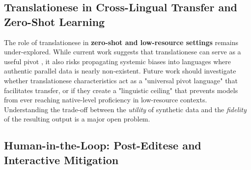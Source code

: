 \documentclass[11pt,a4paper]{article}
\begin{document}
\subsection{Translationese in Cross-Lingual Transfer and Zero-Shot Learning}

The role of translationese in \textbf{zero-shot and low-resource settings} remains under-explored. While current work suggests that translationese can serve as a useful pivot \cite{dabre2024pretraining, riley2020translationese}, it also risks propagating systemic biases into languages where authentic parallel data is nearly non-existent. Future work should investigate whether translationese characteristics act as a "universal pivot language" that facilitates transfer, or if they create a "linguistic ceiling" that prevents models from ever reaching native-level proficiency in low-resource contexts. Understanding the trade-off between the \textit{utility} of synthetic data and the \textit{fidelity} of the resulting output is a major open problem.

\subsection{Human-in-the-Loop: Post-Editese and Interactive Mitigation}
\end{document}
